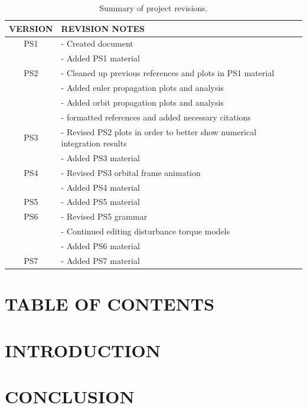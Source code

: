 \documentclass[12pt,a4paper,notitlepage]{article}
\begin{document}
\begin{table}[h!]
\begin{center}
\begin{tabular} [0.9 \textwidth]{cl}
\hline \hline
\multicolumn{1}{c}{VERSION} & \multicolumn{1}{l}{REVISION NOTES} \\
\hline
PS1 & - Created document \\
    & - Added PS1 material \\
\hline
PS2 & - Cleaned up previous references and plots in PS1 material \\
    & - Added euler propagation plots and analysis \\
    & - Added orbit propagation plots and analysis \\
    & - formatted references and added necessary citations \\
\hline
PS3 & - Revised PS2 plots in order to better show numerical integration results\\
    & - Added PS3 material\\
\hline 
PS4 & - Revised PS3 orbital frame animation \\
    & - Added PS4 material\\
\hline
PS5 & - Added PS5 material \\
\hline
PS6 & - Revised PS5 grammar \\
    & - Continued editing disturbance torque models \\
    & - Added PS6 material \\
\hline
PS7 & - Added PS7 material \\
\hline \hline
\end{tabular}
	\caption{Summary of project revisions.}
\end{center}
\end{table}
 
\newpage
\section*{\Large TABLE OF CONTENTS}
\makeatletter
{}
\makeatother
\newpage

\section{\Large INTRODUCTION}









\section{\Large CONCLUSION}



\end{document}

